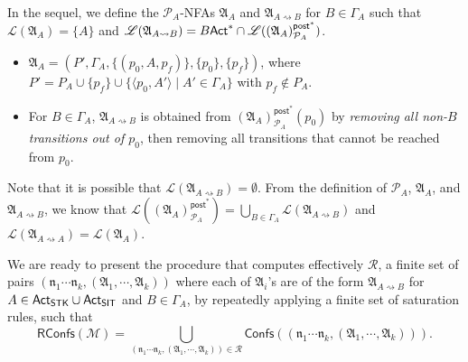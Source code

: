 \documentclass[preprint,12pt]{elsarticle}
\newcommand\Mm{{\mathcal{M} }}
\newcommand\Pp{{\mathcal{P} }}
\newcommand\act{{\sf Act}}
\newcommand\lmd{{\sf Lmd}}
\newcommand\singletask{{\sf STK}}
\newcommand\singleinstance{{\sf SIT}}
\newcommand\startactivity{{\mathsf{start} }}
\newcommand\confs{{\mathsf{Confs} }}
\newcommand\conf{{\mathsf{Conf} }}
\newcommand\post{{\mathsf{post} }}
\newcommand\aname{\mathfrak{n}}
\newcommand\AutReach{\mathscr{R}}
\newcommand\RConfs{\mathsf{RConfs}}
\newcommand{\STK}{\mathsf{STK}}
\newcommand\Aut{{\mathfrak{A} }}
\newcommand\Lang{{\mathscr{L} }}
\newcommand\ConfSet{{\mathscr{C} }}
\newcommand{\NFA}{\textsf{NFA}}
\newcommand\topact{\mathsf{Top}}
\newcommand\btmact{\mathsf{Btm}}
\begin{document}
In the sequel, we define the $\Pp_{A}$-{\NFA}s $\Aut_{A}$ and $\Aut_{A\rightsquigarrow B}$ for $B \in \Gamma_A$ such that $\Lang(\Aut_A) = \{A\}$ and $\Lang(\Aut_{A\rightsquigarrow B}) =B\act^* \cap \Lang((\Aut_{A})^{\post^*}_{\Pp_A})$. 
\begin{itemize}
    \item $\Aut_{A} = (P', \Gamma_A, \{(p_0, A, p_f)\},\{p_0\},\{p_f\} )$, where $P' = P_A \cup \{p_f\} \cup \{\langle p_0,A'\rangle \mid A'\in\Gamma_A\}$ with $p_f \not \in P_A$.  
    \item For $B \in \Gamma_A$, $\Aut_{A\rightsquigarrow B}$ is obtained from $(\Aut_{A})^{\post^*}_{\Pp_A}(p_0)$ by \emph{removing all non-$B$ transitions out of $p_0$}, then removing all transitions that cannot be reached from $p_0$. 
\end{itemize}
Note that it is possible that $\Lang(\Aut_{A\rightsquigarrow B}) = \emptyset$.
From the definition of $\Pp_A$, $\Aut_A$, and $\Aut_{A\rightsquigarrow B}$, we know that $\Lang((\Aut_A)^{\post^*}_{\Pp_A}) = \bigcup\limits_{B\in\Gamma_A} \Lang(\Aut_{A\rightsquigarrow B})$ and $\Lang(\Aut_{A\rightsquigarrow A}) = \Lang(\Aut_A)$. 


%

We are ready to present the procedure that computes effectively $\AutReach$, a finite set of pairs $(\aname_1 \cdots \aname_k, (\Aut_1, \cdots, \Aut_k))$ where each of $\Aut_i$'s are of the form $\Aut_{A\rightsquigarrow B}$ for $A \in \act_\singletask\cup\act_\singleinstance$ and $B \in \Gamma_A$, by repeatedly applying a finite set of saturation rules, such that
\[\RConfs(\Mm) = \bigcup \limits_{(\aname_1 \cdots \aname_k, (\Aut_1, \cdots, \Aut_k)) \in \AutReach} \confs((\aname_1 \cdots \aname_k, (\Aut_1, \cdots, \Aut_k))).\]
\end{document}
